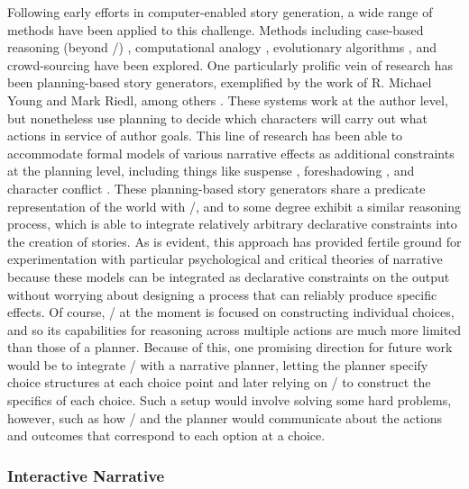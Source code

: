 Following early efforts in computer-enabled story generation, a wide range of methods have been applied to this challenge.
%
Methods including case-based reasoning (beyond \minstrel/) \citep{Gervas2005}, computational analogy \citep{Zhu2010}, evolutionary algorithms \citep{Bui2010}, and crowd-sourcing \citep{Li2013} have been explored.
%
One particularly prolific vein of research has been planning-based story generators, exemplified by the work of R. Michael Young and Mark Riedl, among others \citep{Young1999,Riedl2004}.
%
These systems work at the author level, but nonetheless use planning to decide which characters will carry out what actions in service of author goals.
%
This line of research has been able to accommodate formal models of various narrative effects as additional constraints at the planning level, including things like suspense \citep{Cheong2006}, foreshadowing \citep{Bae2008}, and character conflict \citep{Ware2014}.
%
These planning-based story generators share a predicate representation of the world with \dunyazad/, and to some degree exhibit a similar reasoning process, which is able to integrate relatively arbitrary declarative constraints into the creation of stories.
%
As is evident, this approach has provided fertile ground for experimentation with particular psychological and critical theories of narrative because these models can be integrated as declarative constraints on the output without worrying about designing a process that can reliably produce specific effects.
%
Of course, \dunyazad/ at the moment is focused on constructing individual choices, and so its capabilities for reasoning across multiple actions are much more limited than those of a planner.
%
Because of this, one promising direction for future work would be to integrate \dunyazad/ with a narrative planner, letting the planner specify choice structures at each choice point and later relying on \dunyazad/ to construct the specifics of each choice.
%
Such a setup would involve solving some hard problems, however, such as how \dunyazad/ and the planner would communicate about the actions and outcomes that correspond to each option at a choice.


\subsubsection{Interactive Narrative}

